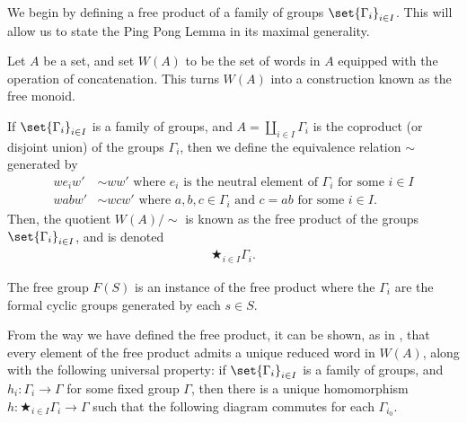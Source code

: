 We begin by defining a free product of a family of groups $\set{\Gamma_i}_{i\in I}$. This will allow us to state the Ping Pong Lemma in its maximal generality.
\begin{definition}\label{def:free_product}
  Let $A$ be a set, and set $W(A)$ to be the set of words in $A$ equipped with the operation of concatenation. This turns $W(A)$ into a construction known as the free monoid.\newline

  If $\set{\Gamma_i}_{i\in I}$ is a family of groups, and $A = \coprod_{i\in I}\Gamma_i$ is the coproduct (or disjoint union) of the groups $\Gamma_i$, then we define the equivalence relation $\sim$ generated by
  \begin{align*}
    we_iw' &\sim ww'\text{ where $e_i$ is the neutral element of $\Gamma_i$ for some $i\in I$}\\
    wabw' &\sim wcw'\text{ where $a,b,c\in \Gamma_i$ and $c=ab$ for some $i\in I$}.
  \end{align*}
  Then, the quotient $W(A)/\sim$ is known as the free product of the groups $\set{\Gamma_i}_{i\in I}$, and is denoted
  \begin{align*}
    \bigstar_{i\in I}\Gamma_i.
  \end{align*}
\end{definition}
\begin{remark}
  The free group $F(S)$ is an instance of the free product where the $\Gamma_i$ are the formal cyclic groups generated by each $s\in S$.\newline

  From the way we have defined the free product, it can be shown, as in \cite[II.A.]{delaHarpe_topics_in_geometric_group_theory}, that every element of the free product admits a unique reduced word in $W(A)$, along with the following universal property: if $\set{\Gamma_i}_{i\in I}$ is a family of groups, and $h_i\colon \Gamma_i\rightarrow\Gamma$ for some fixed group $\Gamma$, then there is a unique homomorphism $h\colon \bigstar_{i\in I}\Gamma_i \rightarrow \Gamma$ such that the following diagram commutes for each $\Gamma_{i_0}$.
  \begin{center}
  \end{center}
\end{remark}

